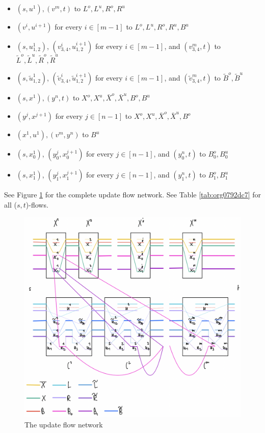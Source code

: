 \documentclass[fontsize=11pt,paper=a4]{book}
\begin{document}
\begin{itemize}
\item \((s,u^1),(v^m,t)\) to \(L^o,L^u,R^o,R^u\)
\item \((v^i,u^{i+1})\) for every \(i\in[m-1]\) to \(L^o,L^u,R^o,R^u,B^u\)
\item \((s,u_{1,2}^1)\), \((v_{3,4}^i,u_{1,2}^{i+1})\) for every \(i\in[m-1]\), and \((v_{3,4}^m,t)\) to \(\tilde{L}^o,\tilde{L}^u,\tilde{R}^o,\tilde{R}^u\)
\item \((s,\tilde{u}_{1,2}^1)\), \((\tilde{v}_{3,4}^i,\tilde{u}_{1,2}^{i+1})\) for every \(i\in[m-1]\), and \((\tilde{v}_{3,4}^m,t)\) to \(\tilde{B}^o,\tilde{B}^u\)
\item \((s,x^1),(y^n,t)\) to \(X^o,X^u,\bar{X}^o,\bar{X}^u,B^o,B^u\)
\item \((y^j,x^{j+1})\) for every \(j\in[n-1]\) to \(X^o,X^u,\bar{X}^o,\bar{X}^u,B^o\)
\item \((x^1,u^1),(v^m,y^n)\) to \(B^u\)
\item \((s,x_0^1)\), \((y_0^j,x_0^{j+1})\) for every \(j\in[n-1]\), and \((y_0^n,t)\) to \(B_0^o,B_0^u\)
\item \((s,x_1^1)\), \((y_1^j,x_1^{j+1})\) for every \(j\in[n-1]\), and \((y_1^n,t)\) to \(B_1^o,B_1^u\)
\end{itemize}

See Figure \ref{fig:orga75fbf5} for the complete update flow network.
See Table \ref{tab:org0792dc7} for all (\(s,t\))-flows.

\begin{figure}[htbp]
\centering
\includegraphics[width=.9\linewidth]{../assets/Screen Shot 2023-02-14 at 15.08.01.png}
\caption{\label{fig:orga75fbf5}The update flow network}
\end{figure}
\end{document}
